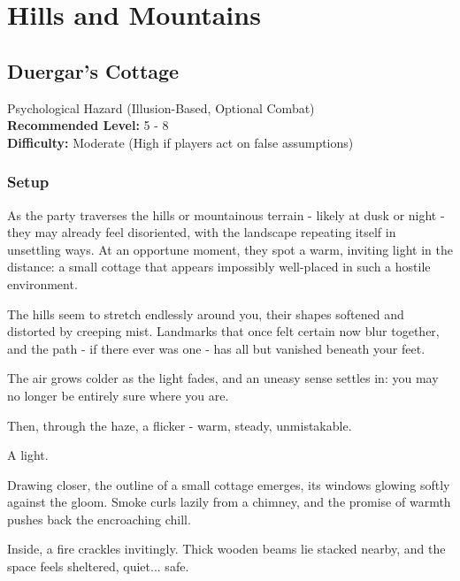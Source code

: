 \chapter*{Hills and Mountains}

\section*{Duergar's Cottage}
{\entryfont Psychological Hazard (Illusion-Based, Optional Combat)\\
\textbf{Recommended Level:} 5 - 8\\
\textbf{Difficulty:} Moderate (High if players act on false assumptions)}
\subsection*{Setup}
{\entryfont As the party traverses the hills or mountainous terrain - likely at dusk or night - they may already feel disoriented, with the landscape repeating itself in unsettling ways. At an opportune moment, they spot a warm, inviting light in the distance: a small cottage that appears impossibly well-placed in such a hostile environment.}
\begin{DndReadAloud}
	The hills seem to stretch endlessly around you, their shapes softened and distorted by creeping mist. Landmarks that once felt certain now blur together, and the path - if there ever was one - has all but vanished beneath your feet.

	The air grows colder as the light fades, and an uneasy sense settles in: you may no longer be entirely sure where you are.

	Then, through the haze, a flicker - warm, steady, unmistakable.

	A light.

	Drawing closer, the outline of a small cottage emerges, its windows glowing softly against the gloom. Smoke curls lazily from a chimney, and the promise of warmth pushes back the encroaching chill.

	Inside, a fire crackles invitingly. Thick wooden beams lie stacked nearby, and the space feels sheltered, quiet... safe.
\end{DndReadAloud}

